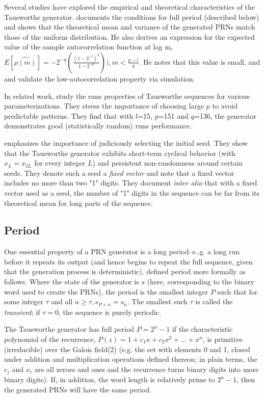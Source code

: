 \documentclass[12pt]{amsart}
\begin{document}
Several studies have explored the empirical and theoretical characteristics of the Tausworthe generator. \cite{Tausworthe} documents the conditions for full period (described below) and shows that the theoretical mean and variance of the generated PRNs match those of the uniform distribution. He also derives an expression for the expected value of the sample autocorrelation function at lag m, $E[\hat{\rho(m)}] = -2^{-q} (\frac{(1-2^{-l})^2}{1-2^{-q}})), m < \frac{p-l}{q}$.  He notes that this value is small, and \cite{Whittlesey} and \cite{NewmanMartin} validate the low-autocorrelation property via simulation.   

In related work, \cite{ToothillRobinsonAdams} study the runs properties of Tausworthe sequences for various parameterizations. They stress the importance of choosing large $p$ to avoid predictable patterns. They find that with $l$=15, $p$=151 and $q$=136, the generator demonstrates good (statistically random) runs performance.  

\cite{MatsumotoKurita} emphasizes the importance of judiciously selecting the initial seed. They show that the Tausworthe generator exhibits short-term cyclical behavior (with $x_L = x_{2L}$ for every integer $L$) and persistent non-randomness around certain seeds. They denote such a seed a \emph{fixed vector} and note that a fixed vector includes no more than two "1" digits. They document \emph{inter alia} that with a fixed vector used as a seed, the number of "1" digits in the sequence can be far from its theoretical mean for long parts of the sequence. 

\subsection{Period}

One essential property of a PRN generator is a long period--e..g. a long run before it repeats its output (and hence begins to repeat the full sequence, given that the generation process is deterministic). \cite{LEcuyer1994} defined period more formally as follows. 
Where the state of the generator is $s$ (here, corresponding to the binary word used to create the PRNs), the period is the smallest integer $P$ such that for some integer $\tau$ and all $n \ge \tau, s_{P+n} = s_n$. The smallest such $\tau$ is called the \emph{transient}; if $\tau=0$, the sequence is purely periodic.

The Tausworthe generator has full period $P = 2^n -1$ if the characteristic polynomial of the recurrence, $P(z) = 1 + c_1 x + c_2 x^2 + \ldots + x^n $, is primitive (irreducible) over the Galois field(2) (e.g. the set with elements 0 and 1, closed under addition and multiplication operations defined thereon; in plain terms, the $c_j$ and $x_i$ are all zeroes and ones and the recurrence turns binary digits into more binary digits).  If, in addition, the word length is relatively prime to $2^n-1$, then the generated PRNs will have the same period. 
\end{document}
